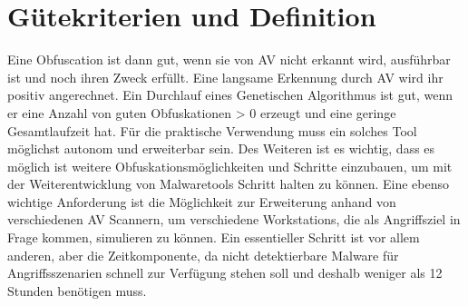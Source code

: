 \section{Gütekriterien und Definition}
\label{Methode:Kriterien}
Eine Obfuscation ist dann gut, wenn sie von AV nicht erkannt wird, ausführbar ist und noch ihren Zweck erfüllt. Eine langsame Erkennung durch AV wird ihr positiv angerechnet. Ein Durchlauf eines Genetischen Algorithmus ist gut, wenn er eine Anzahl von guten Obfuskationen > 0 erzeugt und eine geringe Gesamtlaufzeit hat.
Für die praktische Verwendung muss ein solches Tool möglichst autonom und erweiterbar sein. Des Weiteren ist es wichtig, dass es möglich ist weitere Obfuskationsmöglichkeiten und Schritte einzubauen, um mit der Weiterentwicklung von Malwaretools Schritt halten zu können. Eine ebenso wichtige Anforderung ist die Möglichkeit zur Erweiterung anhand von verschiedenen AV Scannern, um verschiedene Workstations, die als Angriffsziel in Frage kommen, simulieren zu können.
Ein essentieller Schritt ist vor allem anderen, aber die Zeitkomponente, da nicht detektierbare Malware für Angriffsszenarien schnell zur Verfügung stehen soll und deshalb weniger als 12 Stunden benötigen muss.